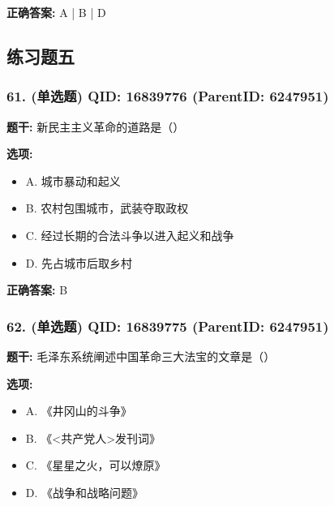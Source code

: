 \documentclass[12pt,UTF8]{ctexart}
\begin{document}
\textbf{正确答案:}
A | B | D

\vspace{0.3em}\hrulefill\vspace{0.7em}

\subsection*{练习题五}

\subsubsection*{61. (单选题) \small QID: 16839776 (ParentID: 6247951)}

\textbf{题干:}
新民主主义革命的道路是（）



\textbf{选项:}
\begin{itemize}[leftmargin=*]

  \item A. 城市暴动和起义

  \item B. 农村包围城市，武装夺取政权

  \item C. 经过长期的合法斗争以进入起义和战争

  \item D. 先占城市后取乡村

\end{itemize}

\textbf{正确答案:}
B

\vspace{0.3em}\hrulefill\vspace{0.7em}

\subsubsection*{62. (单选题) \small QID: 16839775 (ParentID: 6247951)}

\textbf{题干:}
毛泽东系统阐述中国革命三大法宝的文章是（）



\textbf{选项:}
\begin{itemize}[leftmargin=*]

  \item A. 《井冈山的斗争》

  \item B. 《<共产党人>发刊词》

  \item C. 《星星之火，可以燎原》

  \item D. 《战争和战略问题》

\end{itemize}
\end{document}

